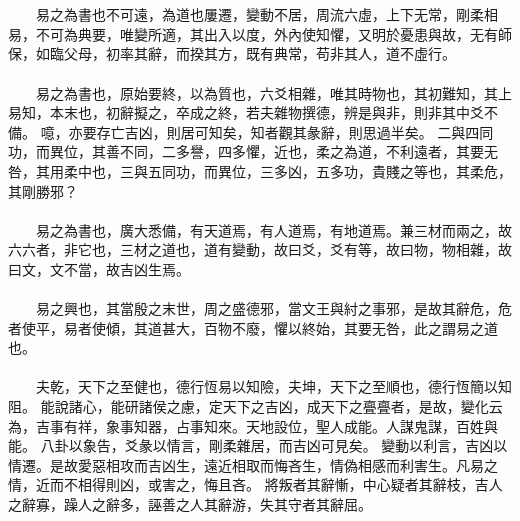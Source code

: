 \\\\
　　易之為書也不可遠，為道也屢遷，變動不居，周流六虛，上下无常，剛柔相易，不可為典要，唯變所適，其出入以度，外內使知懼，又明於憂患與故，无有師保，如臨父母，初率其辭，而揆其方，既有典常，苟非其人，道不虛行。 
\\\\
　　易之為書也，原始要終，以為質也，六爻相雜，唯其時物也，其初難知，其上易知，本末也，初辭擬之，卒成之終，若夫雜物撰德，辨是與非，則非其中爻不備。 噫，亦要存亡吉凶，則居可知矣，知者觀其彖辭，則思過半矣。 二與四同功，而異位，其善不同，二多譽，四多懼，近也，柔之為道，不利遠者，其要无咎，其用柔中也，三與五同功，而異位，三多凶，五多功，貴賤之等也，其柔危，其剛勝邪？ 
\\\\
　　易之為書也，廣大悉備，有天道焉，有人道焉，有地道焉。兼三材而兩之，故六六者，非它也，三材之道也，道有變動，故曰爻，爻有等，故曰物，物相雜，故曰文，文不當，故吉凶生焉。 
\\\\
　　易之興也，其當殷之末世，周之盛德邪，當文王與紂之事邪，是故其辭危，危者使平，易者使傾，其道甚大，百物不廢，懼以終始，其要无咎，此之謂易之道也。 
\\\\
　　夫乾，天下之至健也，德行恆易以知險，夫坤，天下之至順也，德行恆簡以知阻。 能說諸心，能研諸侯之慮，定天下之吉凶，成天下之亹亹者，是故，變化云為，吉事有祥，象事知器，占事知來。天地設位，聖人成能。人謀鬼謀，百姓與能。 八卦以象告，爻彖以情言，剛柔雜居，而吉凶可見矣。 變動以利言，吉凶以情遷。是故愛惡相攻而吉凶生，遠近相取而悔吝生，情偽相感而利害生。凡易之情，近而不相得則凶，或害之，悔且吝。 將叛者其辭慚，中心疑者其辭枝，吉人之辭寡，躁人之辭多，誣善之人其辭游，失其守者其辭屈。
